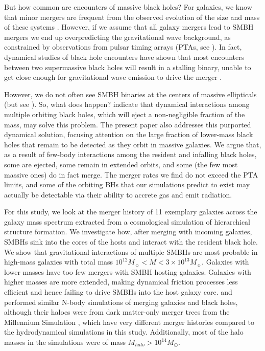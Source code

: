 \documentclass[fleqn,usenatbib,useAMS]{mnras}
\begin{document}

But how common are encounters of massive black holes?  For galaxies, we know that minor mergers are frequent from the observed evolution of the size and mass of these systems \citep{2010ApJ...718L..73V, 2008ApJ...677L...5V, 2019MNRAS.484..595M}. However, if we assume that all galaxy mergers lead to SMBH mergers we end up overpredicting the  gravitational wave background, as constrained by observations from pulsar timing arrays (PTAs, see \citealt{2008MNRAS.390..192S, 2009MNRAS.394.2255S, 2013MNRAS.433L...1S, 2014ApJ...789..156M, 2015ApJ...799..178K, 2016APS..APRR18003T, 2018ApJ...856...42S, 2018MNRAS.479.4017I, 2018ApJ...863L..36I, 2018NatCo...9..573M}). In fact, dynamical studies of black hole encounters have shown that most encounters between two supermassive black holes will result in a stalling binary, unable to get close enough for gravitational wave emission to drive the merger \citep{1980Natur.287..307B, 2003AIPC..686..201M}.

However, we do not often see SMBH binaries at the centers of massive ellipticals (but see \citealt{2016MNRAS.463.2145C}).  So, what does happen?  \cite{2018MNRAS.473.3410R} indicate that dynamical interactions among multiple orbiting black holes, which will eject a non-negligible fraction of the mass, may solve this problem.  The present paper also addresses this purported dynamical solution, focusing attention on the large fraction of lower-mass black holes that remain to be detected as they orbit in massive galaxies.  We argue that, as a result of few-body interactions among the resident and infalling black holes, some are ejected, some remain in extended orbits, and some (the few most massive ones) do in fact merge. The merger rates we find do not exceed the PTA limits, and some of the orbiting BHs that our simulations predict to exist may actually be detectable via their ability to accrete gas and emit radiation.

For this study, we look at the merger history of 11 exemplary galaxies across the galaxy mass spectrum extracted from a cosmological simulation of hierarchical structure formation. We investigate how, after merging with incoming galaxies, SMBHs sink into the cores of the hosts and interact with the resident black hole. We show that gravitational interactions of multiple SMBHs are most probable in high-mass galaxies with total mass $10^{12} M_{\sun} < M < 3\times10^{13} M_{\sun}$. Galaxies with lower masses have too few mergers with SMBH hosting galaxies. Galaxies with higher masses are more extended, making dynamical friction processes less efficient and hence failing to drive SMBHs into the host galaxy core.  \cite{2012MNRAS.422.1306K} and \cite{2018MNRAS.473.3410R} performed similar N-body simulations of merging galaxies and black holes, although their haloes were from dark matter-only merger trees from the Millennium Simulation \citep{2005Natur.435..629S}, which have very different merger histories compared to the hydrodynamical simulations in this study.  Additionally, most of the halo masses in the \cite{2012MNRAS.422.1306K} simulations were of mass $M_{halo} > 10^{14} M_{\odot}$.
\end{document}
